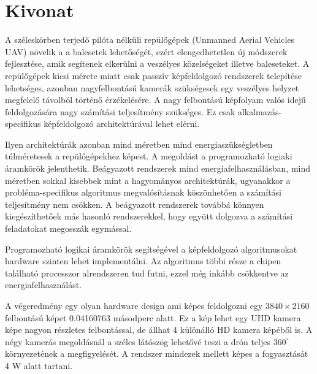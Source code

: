 \chapter*{Kivonat}
A széleskörben terjedő pilóta nélküli repülőgépek (Unmanned Aerial Vehicles UAV) növelik a a balesetek lehetőségét, ezért elengedhetetlen új módszerek fejlesztése, amik segítenek elkerülni a veszélyes közelségeket illetve baleseteket.
A repülőgépek kicsi mérete miatt csak passzív képfeldolgozó rendszerek telepítése lehetséges, azonban nagyfelbontású kamerák szükségesek egy veszélyes helyzet megfelelő távolból történő érzékelésére.
A nagy felbontású képfolyam valós idejű feldolgozására nagy számítási teljesítmény szükséges.
Ez csak alkalmazás-specifikus képfeldolgozó architektúrával lehet elérni.

Ilyen architektúrák azonban mind méretben mind energiaszükségletben túlméretesek a repülőgépekhez képest.
A megoldást a programozható logiaki áramkörök jelenthetik.
Beágyazott rendszerek mind energiafelhasználásban, mind méretben sokkal kisebbek mint a hagyományos architektúrák, ugyanakkor a probléma-specifikus algoritmus megvalósításnak köszönhetően a számítási teljesítmény nem csökken.
A beágyazott rendszerek továbbá könnyen kiegészíthetőek más hasonló rendszerekkel, hogy együtt dolgozva a számítási feladatokat megosszák egymással.

Programozható logikai áramkörök segítségével a képfeldolgozó algoritmusokat hardware szinten lehet implementálni.
Az algoritmus többi része a chipen található processzor alrendszeren tud futni, ezzel még inkább csökkentve az energiafelhasználást.

A végeredmény egy olyan hardware design ami képes feldolgozni egy $3840 \times 2160$ felbontású képet 0.04160763 másodperc alatt.
Ez a kép lehet egy UHD kamera képe nagyon részletes felbontással, de állhat 4 különálló HD kamera képéből is.
A négy kamerás megoldásnál a széles látószög lehetővé teszi a drón teljes $360^\circ$ környezetének a megfigyelését.
A rendszer mindezek mellett képes a fogyasztását 4 W alatt tartani.

